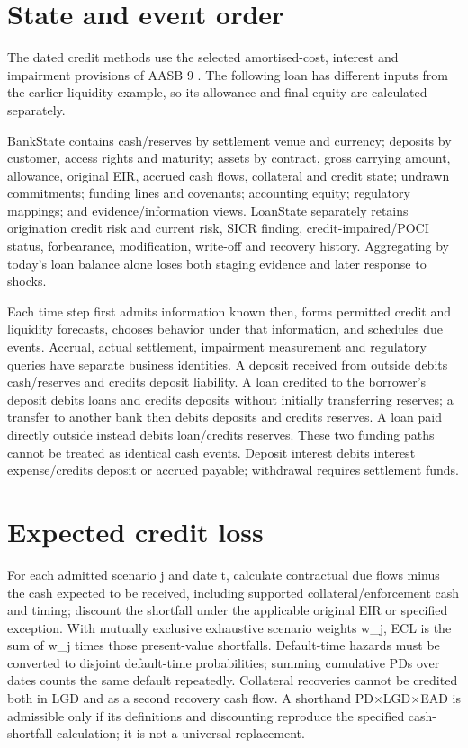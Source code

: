 \hypertarget{state-and-event-order}{%
\section{State and event order}\label{method-bank-methods-state-and-event-order}}

The dated credit methods use the selected amortised-cost, interest and impairment provisions of AASB 9 \citep{aasb9dated}. The following loan has different inputs from the earlier liquidity example, so its allowance and final equity are calculated separately.

BankState contains cash/reserves by settlement venue and currency; deposits by customer, access rights and maturity; assets by contract, gross carrying amount, allowance, original EIR, accrued cash flows, collateral and credit state; undrawn commitments; funding lines and covenants; accounting equity; regulatory mappings; and evidence/information views. LoanState separately retains origination credit risk and current risk, SICR finding, credit-impaired/POCI status, forbearance, modification, write-off and recovery history. Aggregating by today's loan balance alone loses both staging evidence and later response to shocks.

Each time step first admits information known then, forms permitted credit and liquidity forecasts, chooses behavior under that information, and schedules due events. Accrual, actual settlement, impairment measurement and regulatory queries have separate business identities. A deposit received from outside debits cash/reserves and credits deposit liability. A loan credited to the borrower's deposit debits loans and credits deposits without initially transferring reserves; a transfer to another bank then debits deposits and credits reserves. A loan paid directly outside instead debits loan/credits reserves. These two funding paths cannot be treated as identical cash events. Deposit interest debits interest expense/credits deposit or accrued payable; withdrawal requires settlement funds.

\hypertarget{expected-credit-loss}{%
\section{Expected credit loss}\label{method-bank-methods-expected-credit-loss}}

For each admitted scenario j and date t, calculate contractual due flows minus the cash expected to be received, including supported collateral/enforcement cash and timing; discount the shortfall under the applicable original EIR or specified exception. With mutually exclusive exhaustive scenario weights w\_j, ECL is the sum of w\_j times those present-value shortfalls. Default-time hazards must be converted to disjoint default-time probabilities; summing cumulative PDs over dates counts the same default repeatedly. Collateral recoveries cannot be credited both in LGD and as a second recovery cash flow. A shorthand PD\ensuremath{\times}LGD\ensuremath{\times}EAD is admissible only if its definitions and discounting reproduce the specified cash-shortfall calculation; it is not a universal replacement.

